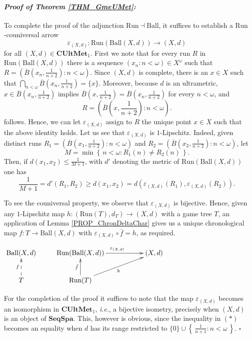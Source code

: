 \documentclass[12pt]{amsart}
\theoremstyle{definition}
\newenvironment{myproof}[2] {\paragraph{\it Proof of {#1} {\ref{#2}}:}}{\hfill$\square$}
\newcommand{\set}[1]{\left\{\, {#1} \,\right\}}
\newcommand{\seq}[1]{{\left( {#1} \right)}}
\newcommand{\Run}{{\mathrm{Run}}}
\newcommand{\CUMet}{\mathbf{CUltMet}_1}
\begin{document}
\begin{myproof}{Theorem}{THM_GmeUMet}
	To complete the proof of the adjunction $\Run\dashv \mathrm{Ball}$, it suffices to establish a $\Run$-couniversal arrow 
	$$\varepsilon_{(X,d)}:\Run(\mathrm{Ball}(X,d))\to (X,d)$$
	for all $(X,d)\in \CUMet$. First we note that for every run $R$ in $\Run(\mathrm{Ball}(X,d))$ there is a sequence $\seq{x_n:n<\omega}\in X^\omega$ such that 
	$R=\seq{\overline{B}\left(x_n,\frac{1}{n+2}\right):n<\omega}$.
	Since $(X,d)$ is complete, there is an $x\in X$ such that $\bigcap_{n<\omega}\overline{B}\left(x_n,\frac{1}{n+2}\right)=\{x\}$. Moreover, because $d$ is an  ultrametric, $x\in \overline{B}\left(x_n,\frac{1}{n+2}\right)$ implies $\overline{B}\left(x,\frac{1}{n+2}\right)=\overline{B}\left(x_n,\frac{1}{n+2}\right)$ for every $n<\omega$, and
	\[
	R=\seq{\overline{B}\left(x,\frac{1}{n+2}\right):n<\omega}.
	\]
	follows. Hence, we can let $\varepsilon_{(X,d)}$ assign to $R$ the unique point $x\in X$ such that the above identity holds.
	Let us see that $\varepsilon_{(X,d)}$ is $1$-Lipschitz. 
	Indeed, given distinct runs $R_1= \seq{\overline{B}\left(x_1,\frac{1}{n+2}\right):n<\omega}$ and $R_2=\seq{\overline{B}\left(x_2,\frac{1}{n+2}\right):n<\omega}$, let
	\[
	M=\min\set{n<\omega: R_1(n)\neq R_2(n)}.
	\]
	Then, if $d(x_1,x_2)\le \frac{1}{M+1}$, with $d'$ denoting the metric of $\Run(\mathrm{Ball}(X,d))$ one has
	\[
	\frac{1}{M+1} = d'(R_1,R_2)\ge d(x_1,x_2)=d(\varepsilon_{(X,d)}(R_1),\varepsilon_{(X,d)}(R_2)).
	\]
	
	To see the couniversal property, we observe that $\varepsilon_{(X,d)}$ is bijective. Hence, given any $1$-Lipschitz map $h:(\Run(T),d_T)\to (X,d)$ with a game tree $T$, an application of Lemma \ref{PROP_ChronDeltaChar} gives us a unique chronological map $f:T\to \mathrm{Ball}(X,d)$ with $\varepsilon_{(X,d)}\circ \bar{f}=h$, as required.
	\begin{center}
		$\xymatrix{\mathrm{Ball}(X,d) & \Run(\mathrm{Ball}(X,d))\ar[rr]^{\varepsilon_{(X,d)}} && (X,d)\\
			T\ar@{-->}[u]^f & \Run(T)\ar[urr]_h\ar[u]^{\bar{f}}&& \\
		}$
		
	\end{center}
	
	For the completion of the proof it suffices to note that the map $\varepsilon_{(X,d)}$ becomes an isomorphism in $\CUMet$, {\em i.e.}, a bijective isometry, precisely when $(X,d)$ is an object of $\mathbf{SeqSpa}$. This, however is obvious, since the inequality in $(*)$ becomes an equality 
	when $d$ has its range restricted to $\{0\}\cup\set{\frac{1}{n+1}:n<\omega}$.
\end{myproof}
\end{document}
